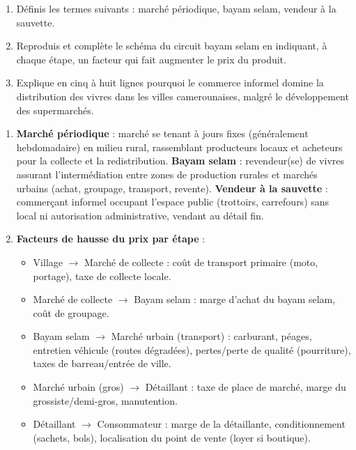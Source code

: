 \documentclass[11pt]{article}
\begin{document}
\begin{exercice}
\begin{enumerate}
\item Définis les termes suivants : marché périodique, bayam selam, vendeur à la sauvette.
\item Reproduis et complète le schéma du circuit bayam selam en indiquant, à chaque étape, un facteur qui fait augmenter le prix du produit.
\item Explique en cinq à huit lignes pourquoi le commerce informel domine la distribution des vivres dans les villes camerounaises, malgré le développement des supermarchés.
\end{enumerate}
\end{exercice}

\begin{corrige}[Exercice]
\begin{enumerate}
\item \textbf{Marché périodique} : marché se tenant à jours fixes (généralement hebdomadaire) en milieu rural, rassemblant producteurs locaux et acheteurs pour la collecte et la redistribution. \textbf{Bayam selam} : revendeur(se) de vivres assurant l'intermédiation entre zones de production rurales et marchés urbains (achat, groupage, transport, revente). \textbf{Vendeur à la sauvette} : commerçant informel occupant l'espace public (trottoirs, carrefours) sans local ni autorisation administrative, vendant au détail fin.
\item \textbf{Facteurs de hausse du prix par étape} : 
\begin{itemize}
\item Village $\to$ Marché de collecte : coût de transport primaire (moto, portage), taxe de collecte locale.
\item Marché de collecte $\to$ Bayam selam : marge d'achat du bayam selam, coût de groupage.
\item Bayam selam $\to$ Marché urbain (transport) : carburant, péages, entretien véhicule (routes dégradées), pertes/perte de qualité (pourriture), taxes de barreau/entrée de ville.
\item Marché urbain (gros) $\to$ Détaillant : taxe de place de marché, marge du grossiste/demi-gros, manutention.
\item Détaillant $\to$ Consommateur : marge de la détaillante, conditionnement (sachets, bols), localisation du point de vente (loyer si boutique).
\end{itemize}

\end{enumerate}
\end{corrige}
\end{document}
